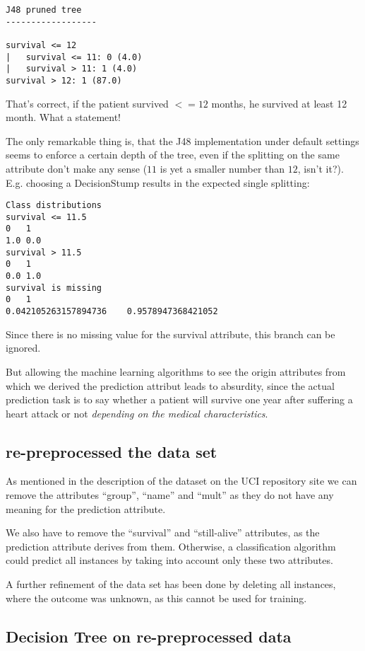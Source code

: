 \documentclass[paper=a4, fontsize=11pt]{scrartcl} %
\numberwithin{equation}{section} %
\numberwithin{figure}{section} %
\numberwithin{table}{section} %
\begin{document}
\begin{lstlisting}
J48 pruned tree
------------------

survival <= 12
|   survival <= 11: 0 (4.0)
|   survival > 11: 1 (4.0)
survival > 12: 1 (87.0)
\end{lstlisting}

That's correct, if the patient survived $ <= 12 $ months, he survived at least 12 month. What a statement! 

The only remarkable thing is, that the J48 implementation under default settings seems to enforce a certain depth of the tree, even if the splitting on the same attribute don't make any sense ($ 11 $ is yet a smaller number than $ 12 $, isn't it?). E.g. choosing a DecisionStump results in the expected single splitting: 
\begin{lstlisting}
Class distributions
survival <= 11.5
0   1   
1.0 0.0 
survival > 11.5
0   1   
0.0 1.0 
survival is missing
0   1   
0.042105263157894736    0.9578947368421052
\end{lstlisting}
Since there is no missing value for the survival attribute, this branch can be ignored.

But allowing the machine learning algorithms to see the origin attributes from which we derived the prediction attribut leads to absurdity, since the actual prediction task is to say whether a patient will survive one year after suffering a heart attack or not \emph{depending on the medical characteristics}.


\subsection{re-preprocessed the data set}

As mentioned in the description of the dataset on the UCI repository site we can remove the attributes ``group'', ``name'' and ``mult'' as they do not have any meaning for the prediction attribute.

We also have to remove the ``survival'' and ``still-alive'' attributes, as the prediction attribute derives from them. Otherwise, a classification algorithm could predict all instances by taking into account only these two attributes.

A further refinement of the data set has been done by deleting all instances, where the outcome was unknown, as this cannot be used for training.

\subsection{Decision Tree on re-preprocessed data}
\end{document}
